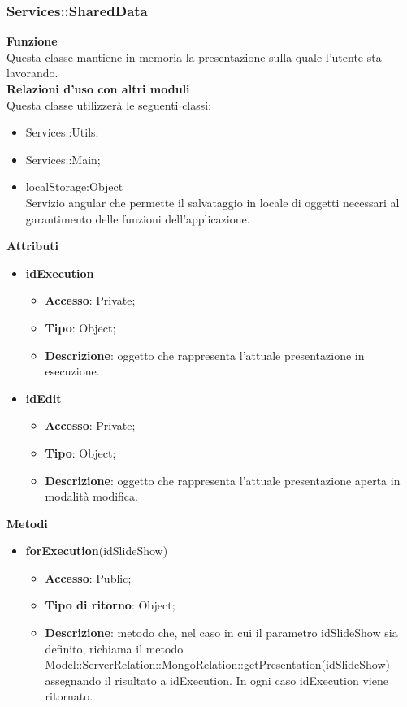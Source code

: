 \subsubsection{Services::SharedData}{
		\label{sub:servicesSharedData}
		\textbf{Funzione}\\
		\indent Questa classe mantiene in memoria la presentazione sulla quale l'utente sta lavorando.\\
		\textbf{Relazioni d'uso con altri moduli}\\
		\indent Questa classe utilizzerà le seguenti classi:
		\begin{itemize}
			\item Services::Utils;
			\item Services::Main;
			\item localStorage:Object\\
				\indent Servizio angular che permette il salvataggio in locale di oggetti necessari al garantimento delle funzioni dell'applicazione.
		\end{itemize}
		\textbf{Attributi}\\
		\begin{itemize}
			\item \textbf{idExecution}
			\begin{itemize}
				\item \textbf{Accesso}: Private;
				\item \textbf{Tipo}: Object;
				\item \textbf{Descrizione}: oggetto che rappresenta l'attuale presentazione in esecuzione.
			\end{itemize}
			\item \textbf{idEdit}
			\begin{itemize}
				\item \textbf{Accesso}: Private;
				\item \textbf{Tipo}: Object;
				\item \textbf{Descrizione}: oggetto che rappresenta l'attuale presentazione aperta in modalità modifica.
			\end{itemize}
		\end{itemize}
		\textbf{Metodi}
		\begin{itemize}
			\item \textbf{forExecution}(idSlideShow)
			\begin{itemize}
				\item \textbf{Accesso}: Public;
				\item \textbf{Tipo di ritorno}: Object;
				\item \textbf{Descrizione}: metodo che, nel caso in cui il parametro idSlideShow sia definito, richiama il metodo Model::\-ServerRelation::\-MongoRelation::\-getPresentation(idSlideShow) assegnando il risultato a idExecution. In ogni caso idExecution viene ritornato.

\end{itemize}
\end{itemize}}

